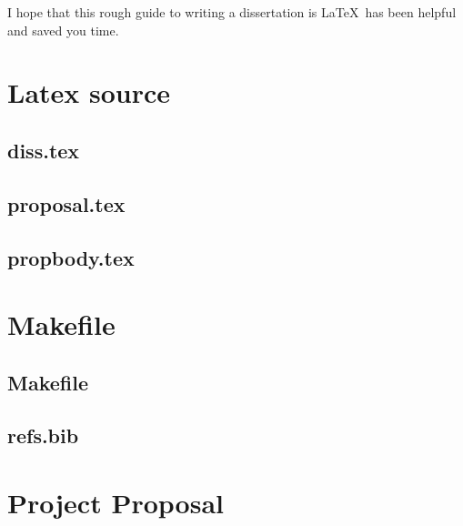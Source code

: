 \documentclass[12pt,twoside,notitlepage]{report}
\begin{document}
I hope that this rough guide to writing a dissertation is \LaTeX\ has
been helpful and saved you time.




\cleardoublepage



\cleardoublepage

\appendix

\chapter{Latex source}

\section{diss.tex}
{\scriptsize}

\section{proposal.tex}
{\scriptsize}

\section{propbody.tex}
{\scriptsize}



\cleardoublepage

\chapter{Makefile}

\section{\label{makefile}Makefile}
{\scriptsize}

\section{refs.bib}
{\scriptsize}


\cleardoublepage

\chapter{Project Proposal}


\end{document}
